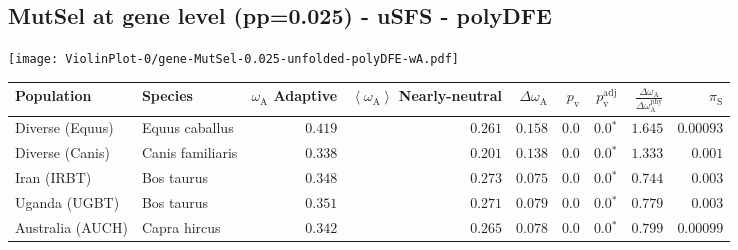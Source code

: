 \subsection{MutSel at gene level (pp=0.025) - uSFS - polyDFE} 
\begin{center}
\texttt{[image: ViolinPlot-0/gene-MutSel-0.025-unfolded-polyDFE-wA.pdf]} 
\begin{adjustbox}{width = 1\textwidth}
\begin{tabular}{|l|l|r|r|r|r|r|r|r|}
\toprule
                     Population &              Species & \specialcell{$\omega_{\mathrm{A}}$ \\ Adaptive} & \specialcell{$\left< \omega_{\mathrm{A}} \right>$ \\ Nearly-neutral} & $\Delta \omega_{\mathrm{A}} $ & $p_{\mathrm{v}}$ & $p_{\mathrm{v}}^{\mathrm{adj}}$ & $\frac{\Delta\omega_{\mathrm{A}}}{\Delta\omega_{\mathrm{A}}^{\mathrm{phy}}}$ & $\pi_{\textrm{S}}$ \\
\midrule
                Diverse (Equus) &       Equus caballus &                                        $ 0.419$ &                                           $ 0.261$ &                      $ 0.158$ &            $0.0$ &                  $\bm{0.0{^*}}$ &                                           $ 1.645$ &          $0.00093$ \\
                Diverse (Canis) &     Canis familiaris &                                        $ 0.338$ &                                           $ 0.201$ &                      $ 0.138$ &            $0.0$ &                  $\bm{0.0{^*}}$ &                                           $ 1.333$ &           $ 0.001$ \\
                    Iran (IRBT) &           Bos taurus &                                        $ 0.348$ &                                           $ 0.273$ &                      $ 0.075$ &            $0.0$ &                  $\bm{0.0{^*}}$ &                                           $ 0.744$ &           $ 0.003$ \\
                  Uganda (UGBT) &           Bos taurus &                                        $ 0.351$ &                                           $ 0.271$ &                      $ 0.079$ &            $0.0$ &                  $\bm{0.0{^*}}$ &                                           $ 0.779$ &           $ 0.003$ \\
               Australia (AUCH) &         Capra hircus &                                        $ 0.342$ &                                           $ 0.265$ &                      $ 0.078$ &            $0.0$ &                  $\bm{0.0{^*}}$ &                                           $ 0.799$ &          $0.00099$ \\

\end{tabular}
\end{adjustbox}
\end{center}
